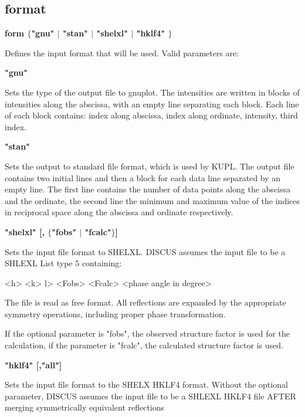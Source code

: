 \subsection*{format}
{\bf form $ \{$"gnu" $| $ "stan" $| $ "shelxl" $| $ "hklf4" $\} $ \par }
\par
\vspace{3pt}
Defines the input format that will be used. 
Valid parameters are: 
\par
{\bf "gnu" \par }
\vspace{3pt}
Sets the type of the output file to gnuplot. The intensities are 
written in blocks of intensities along the abscissa, with an empty 
line separating each block. Each line of each block contains: 
index along abscissa, index along ordinate, intensity, third index. 
\par
{\bf "stan" \par }
\vspace{3pt}
Sets the output to standard file format, which is used by KUPL. 
The output file contains two initial lines and then a block for each 
data line separated by an empty line. The first line contains the 
number of data points along the abscissa and the ordinate, the 
second line the minimum and maximum value of the indices in reciprocal 
space along the abscissa and ordinate respectively. 
\par
{\bf "shelxl" [, $ \{$"fobs" $| $ "fcalc"$\} $] \par }
\vspace{3pt}
Sets the input file format to SHELXL. DISCUS assumes the input file 
to be a SHLEXL List type 5 containing: 
\par
\begin{MacVerbatim}
  <h> <k> l> <Fobs> <Fcalc> <phase angle in degree>
\end{MacVerbatim}
The file is read as free format. All reflections are expanded by the 
appropriate symmetry operations, including proper phase transformation. 
\par
If the optional parameter is "fobs", the observed structure factor is 
used for the calculation, if the parameter is "fcalc", the calculated 
structure factor is used. 
\par
{\bf "hklf4" [,"all"] \par }
\vspace{3pt}
Sets the input file format to the SHELX HKLF4 format. 
Without the optional parameter, DISCUS assumes the input file to be 
a SHLEXL HKLF4 file AFTER merging symmetrically equivalent reflections 
